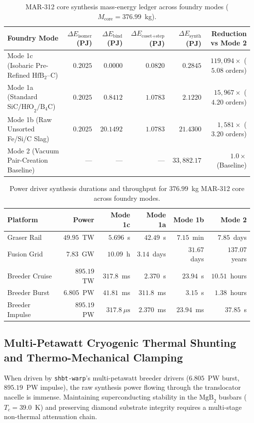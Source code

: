 \documentclass[11pt,onecolumn]{article}
\begin{document}
\begin{table}[!htbp]
\centering\small
\caption{MAR-312 core synthesis mass-energy ledger across foundry modes ($M_{\text{core}} = 376.99$~kg).}
\label{tab:foundry_modes}
\begin{tabularx}{\textwidth}{@{}X r r r r r@{}}
\toprule
Foundry Mode & $\Delta E_{\text{isomer}}$ (PJ) & $\Delta E_{\text{bind}}$ (PJ) & $\Delta E_{\text{coset+step}}$ (PJ) & $\Delta E_{\text{synth}}$ (PJ) & Reduction vs Mode 2 \\
\midrule
Mode 1c (Isobaric Pre-Refined $\text{HfB}_2\text{--C}$) & $0.2025$ & $0.0000$ & $0.0820$ & $0.2845$ & $119{,}094\times$ ($5.08$ orders) \\
Mode 1a (Standard $\text{SiC/HfO}_2/\text{B}_4\text{C}$) & $0.2025$ & $0.8412$ & $1.0783$ & $2.1220$ & $15{,}967\times$ ($4.20$ orders) \\
Mode 1b (Raw Unsorted Fe/Si/C Slag) & $0.2025$ & $20.1492$ & $1.0783$ & $21.4300$ & $1{,}581\times$ ($3.20$ orders) \\
Mode 2 (Vacuum Pair-Creation Baseline) & --- & --- & --- & $33{,}882.17$ & $1.0\times$ (Baseline) \\
\bottomrule
\end{tabularx}
\end{table}

\begin{table}[!htbp]
\centering\small
\caption{Power driver synthesis durations and throughput for $376.99$~kg MAR-312 core across foundry modes.}
\label{tab:power_drivers}
\begin{tabularx}{\textwidth}{@{}p{3.5cm} r r r r r@{}}
\toprule
Platform & Power & Mode 1c & Mode 1a & Mode 1b & Mode 2 \\
\midrule
Graser Rail & $49.95$~TW & $5.696$~s & $42.49$~s & $7.15$~min & $7.85$~days \\
Fusion Grid & $7.83$~GW & $10.09$~h & $3.14$~days & $31.67$~days & $137.07$~years \\
Breeder Cruise & $895.19$~TW & $317.8$~ms & $2.370$~s & $23.94$~s & $10.51$~hours \\
Breeder Burst & $6.805$~PW & $41.81$~ms & $311.8$~ms & $3.15$~s & $1.38$~hours \\
Breeder Impulse & $895.19$~PW & $317.8~\mu\text{s}$ & $2.370$~ms & $23.94$~ms & $37.85$~s \\
\bottomrule
\end{tabularx}
\end{table}

\FloatBarrier
\subsection[Multi-PW Cryogenic Thermal Shunting]{Multi-Petawatt Cryogenic Thermal Shunting and Thermo-Mechanical Clamping}
\label{subsec:cryo_thermal_shunting}
When driven by \texttt{shbt-warp}'s multi-petawatt breeder drivers ($6.805$~PW burst, $895.19$~PW impulse), the raw synthesis power flowing through the translocator nacelle is immense. Maintaining superconducting stability in the $\text{MgB}_2$ busbars ($T_c = 39.0$~K) and preserving diamond substrate integrity requires a multi-stage non-thermal attenuation chain.
\end{document}
